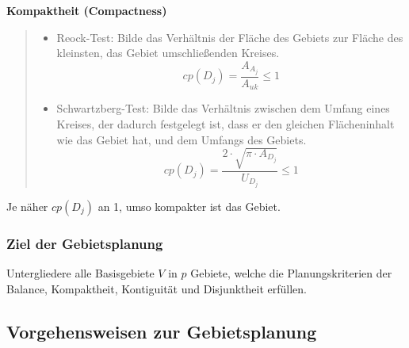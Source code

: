           \par \textbf{Kompaktheit (Compactness)}

          \begin{quote}
            \begin{itemize}

              \item Reock-Test: Bilde das Verhältnis der Fläche des Gebiets zur Fläche des kleinsten, das Gebiet umschließenden Kreises.
              \begin{equation*}
                cp(D_j) = \frac{A_{A_j}}{A_{uk}} \leq 1
              \end{equation*}

              \item Schwartzberg-Test: Bilde das Verhältnis zwischen dem Umfang eines Kreises, der dadurch festgelegt ist, dass er den gleichen Flächeninhalt wie das Gebiet hat, und dem Umfangs des Gebiets.
              \begin{equation*}
                cp(D_j) = \frac{2 \cdot \sqrt{\pi \cdot A_{D_j}}}{U_{D_j}} \leq 1
              \end{equation*}

            \end{itemize}
          \end{quote}
            

            Je näher $cp(D_j)$ an 1, umso kompakter ist das Gebiet.


        \subsubsection{Ziel der Gebietsplanung} %
        \label{ssub:ziel_der_gebietsplanung}

          \par Untergliedere alle Basisgebiete $V$ in $p$ Gebiete, welche die Planungskriterien der Balance, Kompaktheit, Kontiguität und Disjunktheit erfüllen.
        
        
        

      \subsection{Vorgehensweisen zur Gebietsplanung} %
      \label{sub:vorgehensweisen_zur_gebietsplanung}

